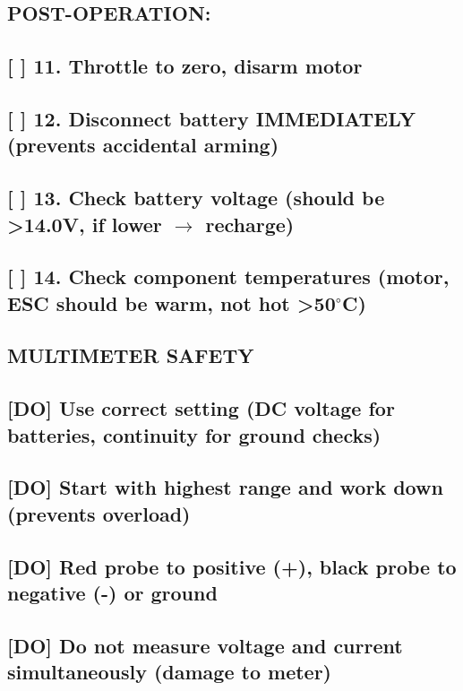 \documentclass[11pt,letterpaper]{article}
\begin{document}
{{\subsection*{POST-OPERATION:}

\subsection*{[ ] 11. Throttle to zero, disarm motor}

\subsection*{[ ] 12. Disconnect battery IMMEDIATELY (prevents accidental arming)}

\subsection*{[ ] 13. Check battery voltage (should be >14.0V, if lower $\rightarrow$ recharge)}

\subsection*{[ ] 14. Check component temperatures (motor, ESC should be warm, not hot >50$^\circ$C)}

\subsection*{MULTIMETER SAFETY}

\subsection*{[DO] Use correct setting (DC voltage for batteries, continuity for ground checks)}

\subsection*{[DO] Start with highest range and work down (prevents overload)}

\subsection*{[DO] Red probe to positive (+), black probe to negative (-) or ground}

\subsection*{[DO] Do not measure voltage and current simultaneously (damage to meter)}

}}
\end{document}
